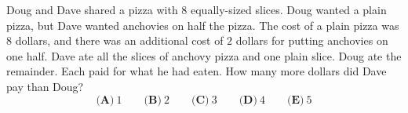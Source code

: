 Doug and Dave shared a pizza with $8$ equally-sized slices. Doug wanted a plain pizza, but Dave wanted anchovies on half the pizza. The cost of a plain pizza was $8$ dollars, and there was an additional cost of $2$ dollars for putting anchovies on one half. Dave ate all the slices of anchovy pizza and one plain slice. Doug ate the remainder. Each paid for what he had eaten. How many more dollars did Dave pay than Doug?
\[\textbf{(A)}\ 1\qquad\textbf{(B)}\ 2\qquad\textbf{(C)}\ 3\qquad\textbf{(D)}\ 4\qquad\textbf{(E)}\ 5\]
